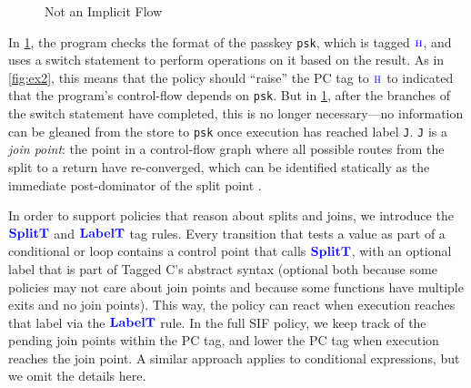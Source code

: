\documentclass{llncs}
\begin{document}
\begin{figure}[t]
\caption{Not an Implicit Flow}
\label{fig:sifex3}
\end{figure}

In \cref{fig:sifex3}, the program checks the format of the passkey {\tt psk}, which is tagged  \(\textnormal{\color{blue} \sc h}\),
and uses a switch statement to perform
operations on it based on the result. As in \cref{fig:ex2}, this means that the policy
should ``raise'' the PC tag to \(\textnormal{\color{blue} \sc h}\) to indicated that the program's control-flow depends on {\tt psk}.
But in \cref{fig:sifex3}, after the branches of the switch statement have completed, this is no
longer necessary---no information can be gleaned from the store to {\tt psk} once execution has
reached label {\tt J}. {\tt J} is a {\em join point}: the point in a control-flow graph where all
possible routes from the split to a return have re-converged, which can be identified
statically as the immediate post-dominator of the split point \cite{Denning77:SecureInformationFlow}.

In order to support policies that reason about splits and joins, we introduce the \(\color{blue} \mathbf{SplitT}\) and
 \(\color{blue} \mathbf{LabelT}\) tag rules. Every transition that tests a
value as part of a conditional or loop contains a control point that calls \(\color{blue} \mathbf{SplitT}\), with an optional
label that is part of Tagged C's abstract syntax (optional both because some policies may not care about join
points and because some functions have multiple exits and no join points). This way, the policy can react when execution
reaches that label via the \(\color{blue} \mathbf{LabelT}\) rule. In the full SIF policy, we keep track of
the pending join points within the PC tag, and lower the PC tag when execution reaches the join point.
A similar approach applies to conditional expressions, but we omit the details here.
\end{document}
